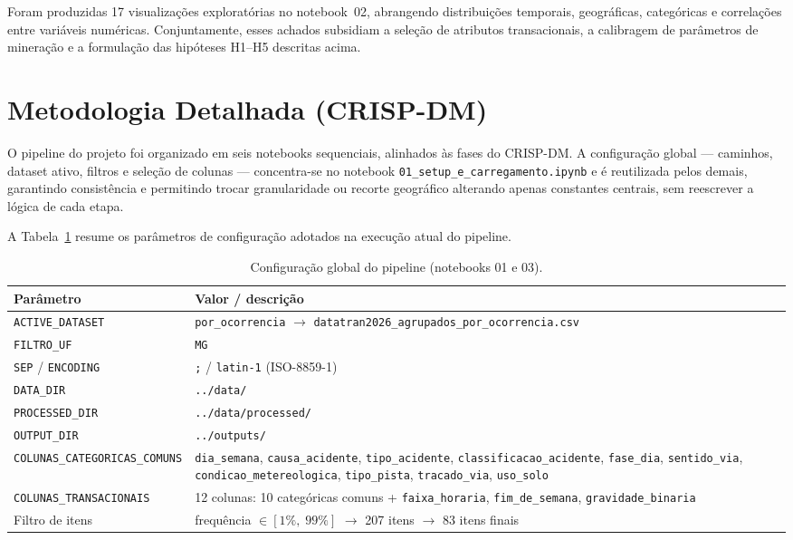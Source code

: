 \documentclass[12pt]{article}
\begin{document}
Foram produzidas 17 visualizações exploratórias no notebook~02, abrangendo distribuições temporais, geográficas, categóricas e correlações entre variáveis numéricas. Conjuntamente, esses achados subsidiam a seleção de atributos transacionais, a calibragem de parâmetros de mineração e a formulação das hipóteses H1--H5 descritas acima.

\section{Metodologia Detalhada (CRISP-DM)}

O pipeline do projeto foi organizado em seis notebooks sequenciais, alinhados às fases do CRISP-DM. A configuração global --- caminhos, dataset ativo, filtros e seleção de colunas --- concentra-se no notebook \texttt{01\_setup\_e\_carregamento.ipynb} e é reutilizada pelos demais, garantindo consistência e permitindo trocar granularidade ou recorte geográfico alterando apenas constantes centrais, sem reescrever a lógica de cada etapa.

A Tabela~\ref{tab:config_global} resume os parâmetros de configuração adotados na execução atual do pipeline.

\begin{table}[H]
    \centering
    \caption{Configuração global do pipeline (notebooks 01 e 03).}
    \label{tab:config_global}
    \small
    \begin{tabular}{@{}p{3.6cm}p{9.8cm}@{}}
        \toprule
        \textbf{Parâmetro} & \textbf{Valor / descrição} \\
        \midrule
        \texttt{ACTIVE\_DATASET} &
        \texttt{por\_ocorrencia} $\rightarrow$ \texttt{datatran2026\_agrupados\_por\_ocorrencia.csv} \\
        \texttt{FILTRO\_UF} & \texttt{MG} \\
        \texttt{SEP} / \texttt{ENCODING} & \texttt{;} / \texttt{latin-1} (ISO-8859-1) \\
        \texttt{DATA\_DIR} & \texttt{../data/} \\
        \texttt{PROCESSED\_DIR} & \texttt{../data/processed/} \\
        \texttt{OUTPUT\_DIR} & \texttt{../outputs/} \\
        \texttt{COLUNAS\_CATEGORICAS\_COMUNS} &
        \texttt{dia\_semana}, \texttt{causa\_acidente}, \texttt{tipo\_acidente}, \texttt{classificacao\_acidente}, \texttt{fase\_dia}, \texttt{sentido\_via}, \texttt{condicao\_metereologica}, \texttt{tipo\_pista}, \texttt{tracado\_via}, \texttt{uso\_solo} \\
        \texttt{COLUNAS\_TRANSACIONAIS} &
        12 colunas: 10 categóricas comuns + \texttt{faixa\_horaria}, \texttt{fim\_de\_semana}, \texttt{gravidade\_binaria} \\
        Filtro de itens & frequência $\in [1\%,\; 99\%]$ $\rightarrow$ 207 itens $\rightarrow$ 83 itens finais \\
        \bottomrule
    \end{tabular}
\end{table}
\end{document}
